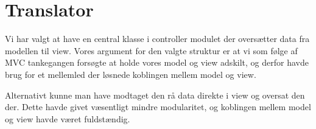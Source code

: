 \section{Translator}

Vi har valgt at have en central klasse i controller modulet der oversætter data fra modellen til view. Vores argument for den valgte struktur er at vi som følge af MVC tankegangen forsøgte at holde vores model og view adskilt, og derfor havde brug for et mellemled der løsnede koblingen mellem model og view.

Alternativt kunne man have modtaget den rå data direkte i view og oversat den der. Dette havde givet væsentligt mindre modularitet, og koblingen mellem model og view havde været fuldstændig.